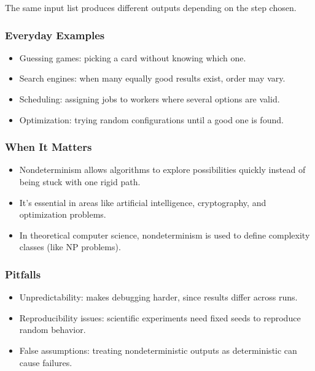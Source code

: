 \documentclass[
  letterpaper,
  DIV=11,
  numbers=noendperiod]{scrreprt}
\providecommand{\tightlist}{%
  \setlength{\itemsep}{0pt}\setlength{\parskip}{0pt}}
\begin{document}
The same input list produces different outputs depending on the step
chosen.

\subsubsection{Everyday Examples}\label{everyday-examples-21}

\begin{itemize}
\tightlist
\item
  Guessing games: picking a card without knowing which one.
\item
  Search engines: when many equally good results exist, order may vary.
\item
  Scheduling: assigning jobs to workers where several options are valid.
\item
  Optimization: trying random configurations until a good one is found.
\end{itemize}

\subsubsection{When It Matters}\label{when-it-matters-20}

\begin{itemize}
\tightlist
\item
  Nondeterminism allows algorithms to explore possibilities quickly
  instead of being stuck with one rigid path.
\item
  It's essential in areas like artificial intelligence, cryptography,
  and optimization problems.
\item
  In theoretical computer science, nondeterminism is used to define
  complexity classes (like NP problems).
\end{itemize}

\subsubsection{Pitfalls}\label{pitfalls-19}

\begin{itemize}
\tightlist
\item
  Unpredictability: makes debugging harder, since results differ across
  runs.
\item
  Reproducibility issues: scientific experiments need fixed seeds to
  reproduce random behavior.
\item
  False assumptions: treating nondeterministic outputs as deterministic
  can cause failures.
\end{itemize}
\end{document}
